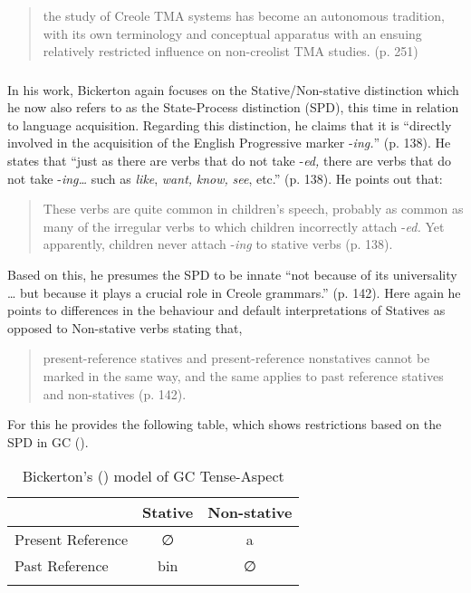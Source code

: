 \begin{quote}
the study of Creole TMA systems has become an autonomous tradition,
with its own terminology and conceptual apparatus with an ensuing
relatively restricted influence on non-creolist TMA studies. (p. 251)
\end{quote}

\subsubsection{\citet{Bickerton1981}}\label{sec:2.1.3.1}

In his \citeyear{Bickerton1981} work, Bickerton again focuses on the Stative\slash Non-stative
distinction which he now also refers to as the State-Process
distinction (SPD), this time in relation to language acquisition.
Regarding this distinction, he claims that it is “directly involved in
the acquisition of the English Progressive marker -\textit{ing.}”
(p. 138).  He states that “just as there are verbs that do not take
-\textit{ed,} there are verbs that do not take -\textit{ing…} such as
\textit{like}, \textit{want,} \textit{know,} \textit{see},
etc.” (p. 138).  He points out that:

\begin{quote}
These verbs are quite common in children’s speech, probably as common
as many of the irregular verbs to which children incorrectly attach
-\textit{ed.} Yet apparently, children never attach -\textit{ing} to
stative verbs (p. 138).
\end{quote}

Based on this, he presumes the SPD to be innate “not because of its
universality … but because it plays a crucial role in Creole
grammars.” (p. 142).  Here again he points to differences in the
behaviour and default interpretations of Statives as opposed to
Non-stative verbs stating that,

\begin{quote}
present-reference statives and present-reference nonstatives cannot be\linebreak
marked in the same way, and the same applies to past reference
statives and non-statives (p. 142).
\end{quote}

For this he provides the following table, which shows restrictions
based on the SPD in GC ().

\begin{table}
  \caption{Bickerton’s (\citeyear[142]{Bickerton1981}) model of GC Tense-Aspect}
  \label{extab:9}
  \begin{tabular}{lcc}
    \lsptoprule 
     & Stative & Non-stative\\
    \midrule
    Present Reference & ∅ & a\\
    Past Reference & bin & ∅  \\
    \lspbottomrule
  \end{tabular}
\end{table}


